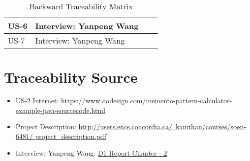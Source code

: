 \documentclass[12pt]{report}
\begin{document}
{\begin{table}[!ht]
\begin{tabular}{|p{2cm}|p{4cm}|p{4cm}|p{4cm}|}
				US-6& Interview: Yanpeng Wang &&\\
				\hline
				
				US-7& Interview: Yanpeng Wang &&\\
				\hline
				
				\hline
				
			\end{tabular}
			\caption{Backward Traceability Matrix}
		\end{table}
		
		\section{Traceability Source}
		
		\begin{itemize}
			\item  US-2 Internet: \href{ https://www.oodesign.com/memento-pattern-calculator-example-java-sourcecode.html}{ https://www.oodesign.com/memento-pattern-calculator-example-java-sourcecode.html} 
			
			\item Project Description:  \href{http://users.encs.concordia.ca/~kamthan/courses/soen-6481/project\_description.pdf}{
				http://users.encs.concordia.ca/~kamthan/courses/soen-6481/ project\_description.pdf
			}
			\item Interview: Yanpeng Wang: \href{ }{
				D1 Report Chapter - 2
			}
			
		\end{itemize}
		
		
		
		
		
		
		
	}
\end{document}
